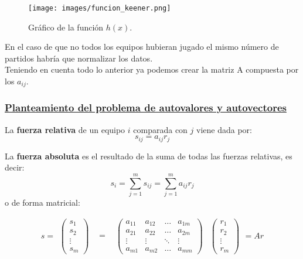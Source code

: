 	\begin{figure}[htb]
		\centering
		\texttt{[image: images/funcion\_keener.png]}
		\caption{Gráfico de la función $h(x)$.} \label{fig:func_skew}
	\end{figure}

En el caso de que no todos los equipos hubieran jugado el mismo número de partidos habría que normalizar los datos.\\

Teniendo en cuenta todo lo anterior ya podemos crear la matriz A compuesta por los $a_{ij}$.

\subsubsection*{\underline{Planteamiento del problema de autovalores y autovectores}}
\begin{defi} 
	La \textbf{fuerza relativa} de un equipo $i$ comparada con $j$ viene dada por: 
	\begin{equation}
		s_{ij} = a_{ij}r_{j}
	\end{equation}
\end{defi}


\begin{defi} 
	La \textbf{fuerza absoluta} es el resultado de la suma de todas las fuerzas relativas, es decir: 
	\begin{equation}
		s_{i}=\sum_{j=1}^{m} s_{ij} = \sum_{j=1}^{m} a_{ij}r_{j} 
	\end{equation}
	o de forma matricial:
	
	\begin{equation}
		s=
		\begin{array}{ccccccc}
			\left(\begin{array}{c}
				s_{1}\\
				s_{2}\\
				\vdots\\
				s_{m}	
			\end{array}\right) & \begin{array}{c}
			=
		\end{array} & \left(\begin{array}{cccc}
		a_{11} & a_{12} & \dots & a_{1m}\\
		a_{21} & a_{22} & \dots & a_{2m} \\
		\vdots & \vdots & \ddots & \vdots\\
		a_{m1} & a_{m2} & \dots & a_{mm}
	\end{array} \right) & \left(\begin{array}{c}
	r_{1}\\
	r_{2}\\
	\vdots\\
	r_{m}
	\end{array} \right) 
	\end{array}  
	=Ar \label{eqkeener}
	\end{equation}
\end{defi}


